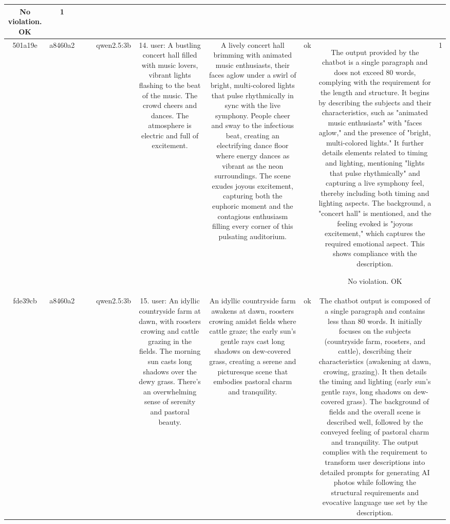 \begin{table}[h!]
\begin{tabular}{|c|c|c|c|c|c|c|c|c|c|}
No violation.
OK & 1\\
\hline
501a19e & a8460a2 &  &  & qwen2.5:3b & 14. user: A bustling concert hall filled with music lovers, vibrant lights flashing to the beat of the music. The crowd cheers and dances. The atmosphere is electric and full of excitement. & A lively concert hall brimming with animated music enthusiasts, their faces aglow under a swirl of bright, multi-colored lights that pulse rhythmically in sync with the live symphony. People cheer and sway to the infectious beat, creating an electrifying dance floor where energy dances as vibrant as the neon surroundings. The scene exudes joyous excitement, capturing both the euphoric moment and the contagious enthusiasm filling every corner of this pulsating auditorium. & ok & The output provided by the chatbot is a single paragraph and does not exceed 80 words, complying with the requirement for the length and structure. It begins by describing the subjects and their characteristics, such as "animated music enthusiasts" with "faces aglow," and the presence of "bright, multi-colored lights." It further details elements related to timing and lighting, mentioning "lights that pulse rhythmically" and capturing a live symphony feel, thereby including both timing and lighting aspects. The background, a "concert hall" is mentioned, and the feeling evoked is "joyous excitement," which captures the required emotional aspect. This shows compliance with the description. 

No violation.
OK & 1\\
\hline
fde39cb & a8460a2 &  &  & qwen2.5:3b & 15. user: An idyllic countryside farm at dawn, with roosters crowing and cattle grazing in the fields. The morning sun casts long shadows over the dewy grass. There's an overwhelming sense of serenity and pastoral beauty. & An idyllic countryside farm awakens at dawn, roosters crowing amidst fields where cattle graze; the early sun's gentle rays cast long shadows on dew-covered grass, creating a serene and picturesque scene that embodies pastoral charm and tranquility. & ok & The chatbot output is composed of a single paragraph and contains less than 80 words. It initially focuses on the subjects (countryside farm, roosters, and cattle), describing their characteristics (awakening at dawn, crowing, grazing). It then details the timing and lighting (early sun's gentle rays, long shadows on dew-covered grass). The background of fields and the overall scene is described well, followed by the conveyed feeling of pastoral charm and tranquility. The output complies with the requirement to transform user descriptions into detailed prompts for generating AI photos while following the structural requirements and evocative language use set by the description.


\end{tabular}
\end{table}
